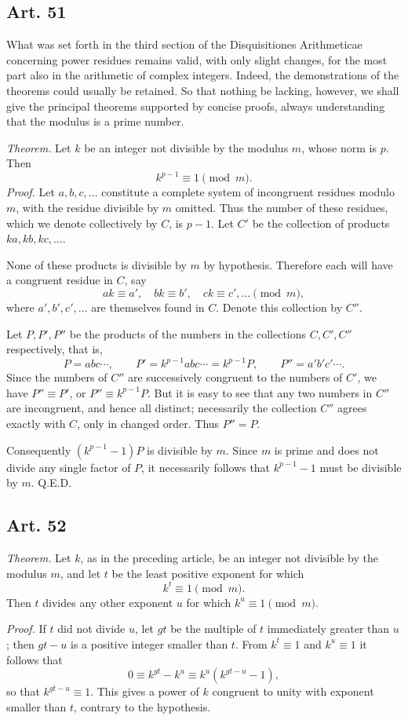 \documentclass[12pt]{article}
\newcommand{\art}[1]{\subsection*{Art. #1}}
\begin{document}
\art{51}
What was set forth in the third section of the Disquisitiones Arithmeticae concerning power residues remains valid, with only slight changes, for the most part also in the arithmetic of complex integers. Indeed, the demonstrations of the theorems could usually be retained. So that nothing be lacking, however, we shall give the principal theorems supported by concise proofs, always understanding that the modulus is a prime number.

\emph{Theorem.} Let $k$ be an integer not divisible by the modulus $m$, whose norm is $p$. Then
\[
k^{p-1}\equiv1\pmod m.
\]
\emph{Proof.} Let $a,b,c,\ldots$ constitute a complete system of incongruent residues modulo $m$, with the residue divisible by $m$ omitted. Thus the number of these residues, which we denote collectively by $C$, is $p-1$. Let $C'$ be the collection of products $ka,kb,kc,\ldots$.

None of these products is divisible by $m$ by hypothesis. Therefore each will have a congruent residue in $C$, say
\[
ak\equiv a',\quad bk\equiv b',\quad ck\equiv c',\ldots\pmod m,
\]
where $a',b',c',\ldots$ are themselves found in $C$. Denote this collection by $C''$.

Let $P,P',P''$ be the products of the numbers in the collections $C,C',C''$ respectively, that is,
\[
P=abc\cdots,
\qquad
P'=k^{p-1}abc\cdots=k^{p-1}P,
\qquad
P''=a'b'c'\cdots.
\]
Since the numbers of $C''$ are successively congruent to the numbers of $C'$, we have $P''\equiv P'$, or $P''\equiv k^{p-1}P$. But it is easy to see that any two numbers in $C''$ are incongruent, and hence all distinct; necessarily the collection $C''$ agrees exactly with $C$, only in changed order. Thus $P''=P$.

Consequently $(k^{p-1}-1)P$ is divisible by $m$. Since $m$ is prime and does not divide any single factor of $P$, it necessarily follows that $k^{p-1}-1$ must be divisible by $m$. Q.E.D.

\art{52}
\emph{Theorem.} Let $k$, as in the preceding article, be an integer not divisible by the modulus $m$, and let $t$ be the least positive exponent for which
\[
k^t\equiv1\pmod m.
\]
Then $t$ divides any other exponent $u$ for which $k^u\equiv1\pmod m$.

\emph{Proof.} If $t$ did not divide $u$, let $gt$ be the multiple of $t$ immediately greater than $u$; then $gt-u$ is a positive integer smaller than $t$. From $k^t\equiv1$ and $k^u\equiv1$ it follows that
\[
0\equiv k^{gt}-k^u\equiv k^u(k^{gt-u}-1),
\]
so that $k^{gt-u}\equiv1$. This gives a power of $k$ congruent to unity with exponent smaller than $t$, contrary to the hypothesis.
\end{document}
